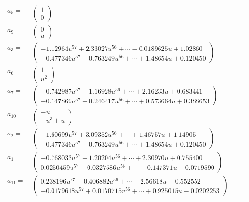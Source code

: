 \documentclass[1p]{elsarticle_modified}
\theoremstyle{definition}
\begin{document}
\begin{tabular}{m{7pt} m{180pt} m{7pt} m{180pt} }
\flushright $a_{5}=$&$\begin{pmatrix}1\\0\end{pmatrix}$ \\
\flushright $a_{9}=$&$\begin{pmatrix}0\\u\end{pmatrix}$ \\
\flushright $a_{3}=$&$\begin{pmatrix}-1.12964 u^{57}+2.33027 u^{56}+\cdots-0.0189625 u+1.02860\\-0.477346 u^{57}+0.763249 u^{56}+\cdots+1.48654 u+0.120450\end{pmatrix}$ \\
\flushright $a_{6}=$&$\begin{pmatrix}1\\u^2\end{pmatrix}$ \\
\flushright $a_{7}=$&$\begin{pmatrix}-0.742987 u^{57}+1.16928 u^{56}+\cdots+2.16233 u+0.683441\\-0.147869 u^{57}+0.246417 u^{56}+\cdots+0.573664 u+0.388653\end{pmatrix}$ \\
\flushright $a_{10}=$&$\begin{pmatrix}- u\\- u^3+u\end{pmatrix}$ \\
\flushright $a_{2}=$&$\begin{pmatrix}-1.60699 u^{57}+3.09352 u^{56}+\cdots+1.46757 u+1.14905\\-0.477346 u^{57}+0.763249 u^{56}+\cdots+1.48654 u+0.120450\end{pmatrix}$ \\
\flushright $a_{1}=$&$\begin{pmatrix}-0.768033 u^{57}+1.20204 u^{56}+\cdots+2.30970 u+0.755400\\0.0250459 u^{57}-0.0327586 u^{56}+\cdots-0.147371 u-0.0719590\end{pmatrix}$ \\
\flushright $a_{11}=$&$\begin{pmatrix}0.238196 u^{57}-0.406882 u^{56}+\cdots-2.56618 u-0.552552\\-0.0179618 u^{57}+0.0170715 u^{56}+\cdots+0.925015 u-0.0202253\end{pmatrix}$ \\

\end{tabular}
\end{document}
